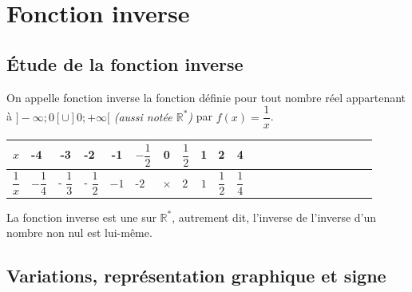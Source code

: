 \documentclass[french]{book}
\renewcommand{\arraystretch}{1.5}
\begin{document}
\setcounter{chapter}{8}
\chapter{Fonction inverse}
\vspace*{-1cm}
%

\section{Étude de la fonction inverse}


\begin{defn}
On appelle fonction inverse la fonction définie pour tout nombre réel appartenant à $]-\infty ; 0[ \cup ] 0 ;+\infty[$ \emph{(aussi notée $\mathbb{R}^*$)} par $f(x)=\dfrac{1}{x}$.
\end{defn}


\begin{exemple}
\begin{center}
\renewcommand{\arraystretch}{2.3}
\begin{tabular}	{|Sl||Sl|Sl|Sl|Sl|Sl|Sl|Sl|Sl|Sl|Sl|}
\hline  $x$ & -4 & -3 & -2 & -1 & $-\dfrac{1}{2}$ & 0 & $\dfrac{1}{2}$ & 1 & 2 & 4 \\
\hline $\dfrac{1}{x}$ & $-\dfrac{1}{4}$ & - $\dfrac{1}{3}$ & - $\dfrac{1}{2}$ & $-1$ & -$2$ & $\times$ & $2$ & $1$ & $\dfrac{1}{2}$ & $\dfrac{1}{4}$ \\
\hline
\end{tabular}
\end{center}
\end{exemple}

\begin{rem}
La fonction inverse est une  sur $\mathbb{R}^*$, autrement dit, l'inverse de l'inverse d'un nombre non nul est lui-même.
\end{rem} 

\section{Variations, représentation graphique et signe}
\end{document}
